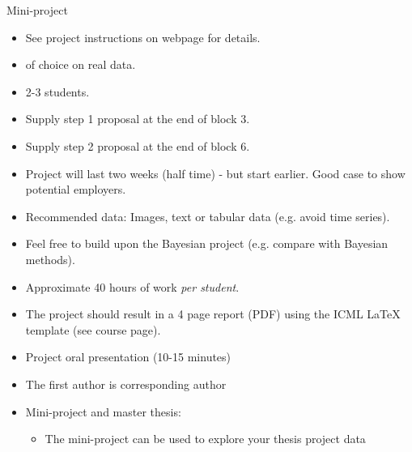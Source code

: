 \documentclass[10pt]{beamer}
\begin{document}
\begin{frame}{Mini-project}

\begin{itemize}
\item See project instructions on webpage for details.\pause
\item {} of choice on real data.
\item 2-3 students.\pause
\item Supply step 1 proposal at the end of block 3.\pause
\item Supply step 2 proposal at the end of block 6.\pause
\item Project will last two weeks (half time) - but start earlier. Good case to show potential employers.
\item Recommended data: Images, text or tabular data (e.g. avoid time series).
\item Feel free to build upon the Bayesian project (e.g. compare with Bayesian methods).
\item Approximate 40 hours of work \emph{per student}.\pause
\item The project should result in a 4 page report (PDF) using the ICML LaTeX template (see course page).
\item Project oral presentation (10-15 minutes)\pause
\item The first author is corresponding author\pause
\item Mini-project and master thesis:
\begin{itemize}
\item The mini-project can be used to explore your thesis project data
\end{itemize}
\end{itemize}
\end{frame}
\end{document}

